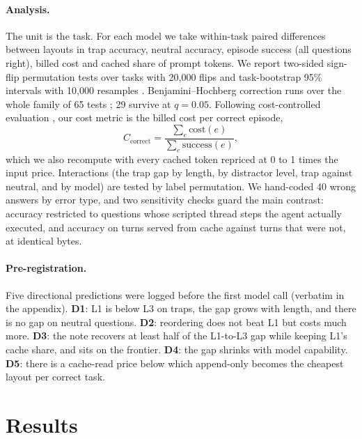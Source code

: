 \paragraph{Analysis.} The unit is the task. For each model we take within-task paired differences between layouts in trap accuracy, neutral accuracy, episode success (all questions right), billed cost and cached share of prompt tokens. We report two-sided sign-flip permutation tests over tasks with 20,000 flips \citep{good2005permutation} and task-bootstrap 95\% intervals with 10,000 resamples \citep{efron1994bootstrap}. Benjamini--Hochberg correction runs over the whole family of 65 tests \citep{benjamini1995bh}; 29 survive at $q = 0.05$. Following cost-controlled evaluation \citep{a2407_01502}, our cost metric is the billed cost per correct episode,
\begin{equation}
C_{\text{correct}} = \frac{\sum_e \mathrm{cost}(e)}{\sum_e \mathrm{success}(e)},
\label{eq:cpc}
\end{equation}
which we also recompute with every cached token repriced at 0 to 1 times the input price. Interactions (the trap gap by length, by distractor level, trap against neutral, and by model) are tested by label permutation. We hand-coded 40 wrong answers by error type, and two sensitivity checks guard the main contrast: accuracy restricted to questions whose scripted thread steps the agent actually executed, and accuracy on turns served from cache against turns that were not, at identical bytes.

\paragraph{Pre-registration.} Five directional predictions were logged before the first model call (verbatim in the appendix). \textbf{D1}: L1 is below L3 on traps, the gap grows with length, and there is no gap on neutral questions. \textbf{D2}: reordering does not beat L1 but costs much more. \textbf{D3}: the note recovers at least half of the L1-to-L3 gap while keeping L1's cache share, and sits on the frontier. \textbf{D4}: the gap shrinks with model capability. \textbf{D5}: there is a cache-read price below which append-only becomes the cheapest layout per correct task.

\section{Results}
\label{sec:results}

